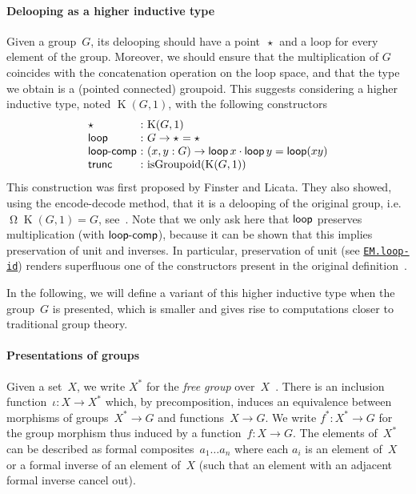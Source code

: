 \documentclass[10pt,a4paper]{amsart}
\theoremstyle{definition}
\newcommand{\freegroup}[1]{#1^*} %
\newcommand{\pt}[1]{\star_{#1}} %
\newcommand{\K}{\operatorname{K}} %
\newcommand{\refl}[1]{\operatorname{refl}_{#1}} %
\newcommand{\pcomp}{\cdot} %
\newcommand{\Loop}{\operatorname{\Omega}} %
\newcommand{\incl}{\iota} %
\newcommand{\isGroupoid}{\operatorname{isGroupoid}} %
\newcommand{\constructor}[1]{\operatorname{\textsf{\textup{#1}}}}
\newcommand{\cloop}{\constructor{loop}}
\newcommand{\cloopcomp}{\constructor{loop-comp}}
\newcommand{\cloopid}{\constructor{loop-id}}
\newcommand{\ctrunc}{\constructor{trunc}}
\newcommand{\ie}{i.e.~}
\newcommand{\agda}[2]{\href{https://smimram.github.io/generated-deloopings-agda/#1.html\##2}{\texttt{#1.#2}}}
\begin{document}
\paragraph{Delooping as a higher inductive type}
Given a group~$G$, its delooping should have a point~$\pt{}$ and a loop for
every element of the group. Moreover, we should ensure that the multiplication
of $G$ coincides with the concatenation operation on the loop space, and that
the type we obtain is a (pointed connected) groupoid. This suggests considering
a higher inductive type, noted $\K(G,1)$, with the following constructors
\[
  \begin{array}{l@{\ :\ }l}
    \pt{}&{\K(G,1)}\\
    \cloop&G\to\pt{}=\pt{}\\
    \cloopcomp&(x,y:G)\to\cloop x\pcomp\cloop y=\cloop(xy)\\
    \ctrunc&\isGroupoid(\K(G,1))
  \end{array}
\]
This construction was first proposed by Finster and Licata. They also showed,
using the encode-decode method, that it is a delooping of the original group,
\ie $\Loop\K(G,1)=G$, see~\cite[Theorem~3.2]{licata2014eilenberg}. Note that we
only ask here that $\cloop$ preserves multiplication (with $\cloopcomp$),
because it can be shown that this implies preservation of unit and inverses. In
particular, preservation of unit (see \agda{EM}{loop-id}) renders superfluous
one of the constructors present in the original
definition~\cite{licata2014eilenberg}.

In the following, we will define a variant of this higher inductive type when
the group~$G$ is presented, which is smaller and gives rise to computations
closer to traditional group theory.

\paragraph{Presentations of groups}
Given a set~$X$, we write $\freegroup{X}$ for the \emph{free group}
over~$X$~\cite[Theorem~6.11.6]{hottbook}. There is an inclusion
function~$\incl:X\to\freegroup{X}$ which, by precomposition, induces an
equivalence between morphisms of groups~$\freegroup{X}\to G$ and
functions~$X\to G$. We write $\freegroup{f}:\freegroup{X}\to G$ for the group
morphism thus induced by a function~$f:X\to G$.
The elements of~$\freegroup X$ can be described as formal
composites~$a_1\ldots a_n$ where each $a_i$ is an element of~$X$ or a formal
inverse of an element of~$X$ (such that an element with an adjacent formal
inverse cancel out).
\end{document}
